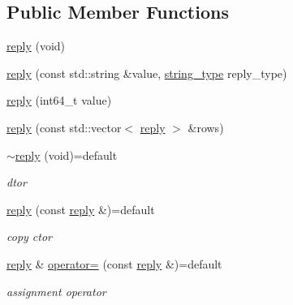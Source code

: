 \subsection*{Public Member Functions}
\begin{DoxyCompactItemize}
\item 
\mbox{\hyperlink{classcpp__redis_1_1reply_a8d0b1f8a18b5c7c3ce79784604dba6cc}{reply}} (void)
\item 
\mbox{\hyperlink{classcpp__redis_1_1reply_a58fb2a051a001f1c3dcf2cd957441dbc}{reply}} (const std\+::string \&value, \mbox{\hyperlink{classcpp__redis_1_1reply_ac192ba4cb8f2bb6e7cb465edf755328b}{string\+\_\+type}} reply\+\_\+type)
\item 
\mbox{\hyperlink{classcpp__redis_1_1reply_a6200b9fa76196e75fb18aa07e47391f0}{reply}} (int64\+\_\+t value)
\item 
\mbox{\hyperlink{classcpp__redis_1_1reply_af3e08b6b795978757a05a1ac4bb08c68}{reply}} (const std\+::vector$<$ \mbox{\hyperlink{classcpp__redis_1_1reply}{reply}} $>$ \&rows)
\item 
\mbox{\label{classcpp__redis_1_1reply_a1acfe6cbc763368cc2a9eef25afffe35}} 
\mbox{\hyperlink{classcpp__redis_1_1reply_a1acfe6cbc763368cc2a9eef25afffe35}{$\sim$reply}} (void)=default
\begin{DoxyCompactList}\small\item\em dtor \end{DoxyCompactList}\item 
\mbox{\label{classcpp__redis_1_1reply_a247955712c519daffcf740ae163e69bb}} 
\mbox{\hyperlink{classcpp__redis_1_1reply_a247955712c519daffcf740ae163e69bb}{reply}} (const \mbox{\hyperlink{classcpp__redis_1_1reply}{reply}} \&)=default
\begin{DoxyCompactList}\small\item\em copy ctor \end{DoxyCompactList}\item 
\mbox{\label{classcpp__redis_1_1reply_a3482157af73f4a60a6386f057e484e5b}} 
\mbox{\hyperlink{classcpp__redis_1_1reply}{reply}} \& \mbox{\hyperlink{classcpp__redis_1_1reply_a3482157af73f4a60a6386f057e484e5b}{operator=}} (const \mbox{\hyperlink{classcpp__redis_1_1reply}{reply}} \&)=default
\begin{DoxyCompactList}\small\item\em assignment operator \end{DoxyCompactList}\item 

\end{DoxyCompactItemize}
